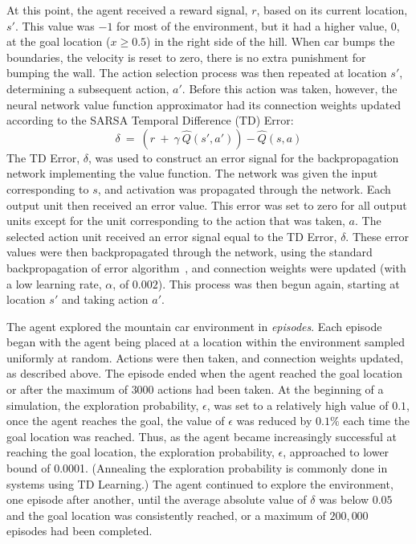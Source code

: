 \documentclass[preprint,12pt,authoryear]{elsarticle}
\begin{document}
At this point, the agent received a reward signal, $r$, based on its
current location, $s'$. This value was $-1$ for most of the
environment, but it had a higher value, $0$, at the goal location ($x \geq 0.5$) in
the right side of the hill. When car bumps the boundaries, the velocity is reset to zero, there is no extra punishment for bumping the wall.
The action selection process was then repeated at location $s'$,
determining a subsequent action, $a'$. Before this action was taken,
however, the neural network value function approximator had its
connection weights updated according to the SARSA Temporal Difference
(TD) Error:
\[ \delta \ = \ \left( r \ + \ \gamma \ \hat{Q}(s',a') \right) -
   \hat{Q}(s,a) \]
The TD Error, $\delta$, was used to construct an error signal for the
backpropagation network implementing the value function. The network
was given the input corresponding to $s$, and activation was
propagated through the network. Each output unit then received an
error value. This error was set to zero for all output units except
for the unit corresponding to the action that was taken, $a$. The 
selected action unit received an error signal equal to the TD Error,
$\delta$. These error values were then backpropagated through the
network, using the standard backpropagation of error
algorithm~\citep{RumelhartDE:1986:BP}, and connection weights were
updated (with a low learning rate, $\alpha$, of $0.002$). This process
was then begun again, starting at location $s'$ and taking action
$a'$.

The agent explored the mountain car environment in
\emph{episodes}. Each episode began with the agent being placed at a
location within the environment sampled uniformly at random. Actions
were then taken, and connection weights updated, as described
above. The episode ended when the agent reached the goal location or
after the maximum of $3000$ actions had been taken. At the beginning of
a simulation, the exploration probability, $\epsilon$, was set to a
relatively high value of $0.1$, once the agent reaches the goal, the value of $\epsilon$ was reduced by $0.1\%$ each time the goal location was reached. Thus, as the agent
became increasingly successful at reaching the goal location, the
exploration probability, $\epsilon$, approached to lower bound of 0.0001. (Annealing the
exploration probability is commonly done in systems using TD
Learning.) The agent continued to explore the environment, one episode
after another, until the average absolute value of $\delta$ was below
$0.05$ and the goal location was consistently reached, or a maximum of
$200,000$ episodes had been completed.
\end{document}
